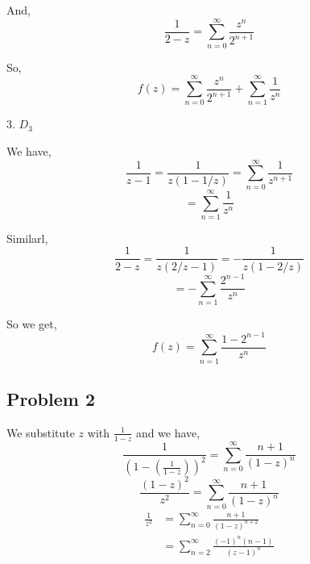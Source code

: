 \documentclass[a4paper]{report}
\begin{document}
And, 
$$ \frac{1}{2-z} = \sum_{n=0}^{\infty} \frac{z^{n}}{2^{n+1}} $$ 

So, 
$$ f(z) = \sum_{n=0}^{\infty} \frac{z^{n}}{2^{n+1}} + \sum_{n=1}^{\infty} \frac{1}{z^{n}} $$ 

3. $D_3$ 

We have, 
$$ \frac{1}{z-1} = \frac{1}{z(1 - 1 /z)} = \sum_{n=0}^{\infty} \frac{1}{z^{n + 1}} $$ 
$$ = \sum_{n=1}^{\infty}\frac{1}{z^{n}} $$ 

Similarl, 
$$ \frac{1}{2-z} = \frac{1}{z(2 /z - 1)} = -\frac{1}{z(1 - 2 /z)}$$ 
$$ = - \sum_{n=1}^{\infty} \frac{2^{n - 1}}{z^{n}} $$ 

So we get, 
$$ f(z) = \sum_{n=1}^{\infty} \frac{1 - 2^{n - 1}}{z^{n}} $$ 


\subsection*{Problem 2}
We substitute $z$ with $\frac{1}{1 - z}$ and we have, 
$$ \frac{1}{(1 - (\frac{1}{1 - z}))^2} = \sum_{n=0}^{\infty} \frac{n+1}{(1-z)^{n}} $$ 
$$ \frac{(1-z)^2}{z^2} = \sum_{n=0}^{\infty} \frac{n+1}{(1-z)^{n}} $$ 
\begin{align*}
    \frac{1}{z^2} &= \sum_{n=0}^{\infty} \frac{n+1}{(1-z)^{n+2}}\\
                  &= \sum_{n=2}^{\infty} \frac{(-1)^{n}(n-1)}{(z - 1)^{n}}
\end{align*}
\end{document}
